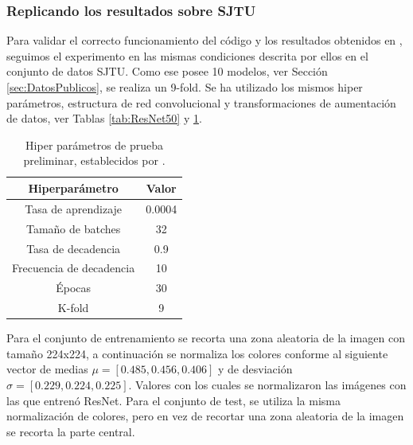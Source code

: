 \subsubsection{Replicando los resultados sobre SJTU}
Para validar el correcto funcionamiento del código y los resultados obtenidos 
en \cite{VQA-PC}, seguimos el experimento en las mismas condiciones descrita 
por ellos en el conjunto de datos SJTU\cite{SJTU}. Como ese posee 10 modelos, 
ver Sección \ref{sec:DatosPublicos}, se realiza un 9-fold. Se ha utilizado 
los mismos hiper parámetros, estructura de red convolucional y transformaciones 
de aumentación de datos, ver Tablas 
\ref{tab:ResNet50} y \ref{tab:HiperSJTU}. 

\begin{table}[htp]
  \begin{center}
    \begin{tabular}[c]{|c|c|}
      \hline
      \rowcolor[HTML]{FFC702}
      \textbf{Hiperparámetro} & \textbf{Valor} \\ 
      \hline 
      Tasa de aprendizaje &  0.0004 \\ 
      \hline 
      Tamaño de batches & 32 \\ 
      \hline 
      Tasa de decadencia & 0.9 \\ 
      \hline 
      Frecuencia de decadencia & 10 \\ 
      \hline 
      Épocas & 30 \\ 
      \hline 
      K-fold & 9 \\ 
      \hline 
    \end{tabular}
  \end{center}
  \caption[Hiper parámetros de prueba preliminar.]{Hiper parámetros de prueba preliminar, establecidos por \cite{VQA-PC}.}
  \label{tab:HiperSJTU}
\end{table}

Para el conjunto de entrenamiento se recorta una zona aleatoria de la imagen con 
tamaño 224x224, a continuación se normaliza los colores conforme al siguiente 
vector de medias $\mu = \left[ 0.485, 0.456, 0.406 \right]$ y de desviación 
$\sigma = \left[ 0.229, 0.224, 0.225 \right]$. Valores con los cuales se 
normalizaron las imágenes con las que entrenó ResNet\cite{ResNet}.
Para el conjunto de test, se utiliza la misma normalización de colores, pero 
en vez de recortar una zona aleatoria de la imagen se recorta la parte central. 


